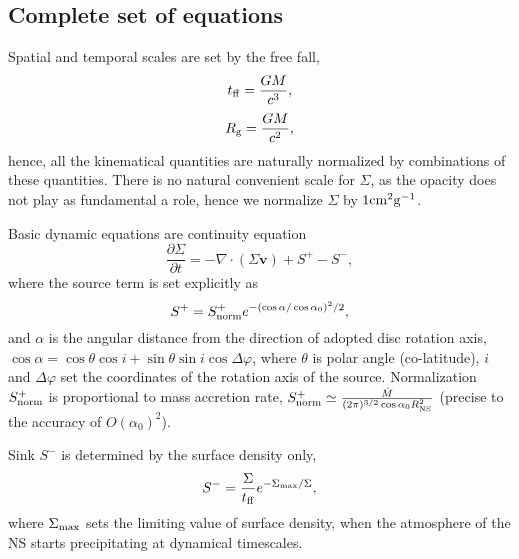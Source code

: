 \documentclass[usenatbib,onecolumn]{mnras}
\renewcommand{\vector}[1]{\ensuremath{\mathbf{#1}}}
\newcommand{\pardir}[2]{\ensuremath{\frac{\partial #2}{\partial #1} }}
\begin{document}
\subsection{Complete set of equations}

Spatial and temporal scales are set by the free fall,
\begin{equation}\label{E:set:timescale}
  t_{\rm ff} = \frac{GM}{c^3},
\end{equation}
\begin{equation}\label{E:set:radius}
  R_{\rm g} = \frac{GM}{c^2},
\end{equation}
hence, all the kinematical quantities are naturally normalized by combinations
of these quantities. There is no natural convenient scale for $\Sigma$, as the
opacity does not play as fundamental a role, hence we normalize $\Sigma$ by
$1{\rm cm^2 g^{-1}}$.

Basic dynamic equations are continuity equation
\begin{equation}\label{E:set:sigma}
\pardir{t}{\Sigma} = - \nabla \cdot (\Sigma \vector{v}) + S^+ - S^-,
\end{equation}
where the source term is set explicitly as
\begin{equation}\label{E:set:source}
S^+ = S^+_{\rm norm}e^{-(\cos\alpha/\cos\alpha_0)^2/2},
\end{equation}
and $\alpha$ is the angular distance from the direction of adopted disc
rotation axis, $\cos \alpha = \cos \theta \cos i+\sin \theta \sin i \cos
\Delta \varphi$, where $\theta$ is polar angle (co-latitude), $i$ and $\Delta
\varphi$ set the coordinates of the rotation axis of the source. Normalization
$S^+_{\rm norm}$ is proportional to mass accretion rate, $S^+_{\rm norm} \simeq
\frac{\dot{M}}{(2\pi)^{3/2} \cos\alpha_0 R_{\rm NS}^2}$ (precise to the
accuracy of $O(\alpha_0)^2$).

Sink $S^-$ is determined by the surface density only,
\begin{equation}\label{E:set:sink}
  S^- = \frac{\Sigma}{t_{\rm ff}} e^{-\Sigma_{\rm max}/\Sigma},
\end{equation}
where $\Sigma_{\rm max}$ sets the limiting value of surface density, when the
atmosphere of the NS starts precipitating at dynamical timescales.
\end{document}
